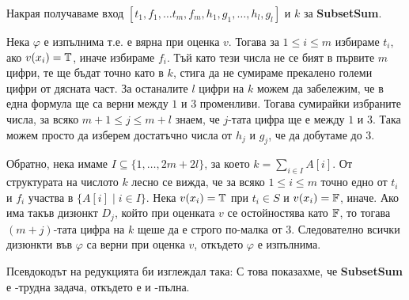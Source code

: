 Накрая получаваме вход $[t_1, f_1, \dots t_m, f_m, h_1, g_1, \dots, h_l, g_l]$ и $k$ за \textbf{SubsetSum}.

Нека $\varphi$ е изпълнима т.е. е вярна при оценка $v$.
Тогава за $1 \leq i \leq m$ избираме $t_i$, ако $v(x_i) = \mathbb{T}$, иначе избираме $f_i$.
Тъй като тези числа не се бият в първите $m$ цифри, те ще бъдат точно като в $k$, стига да не сумираме прекалено големи цифри от дясната част.
За останалите $l$ цифри на $k$ можем да забележим, че в една формула ще са верни между $1$ и $3$ променливи.
Тогава сумирайки избраните числа, за всяко $m + 1 \leq j \leq m + l$ знаем, че $j$-тата цифра ще е между $1$ и $3$.
Така можем просто да изберем достатъчно числа от $h_j$ и $g_j$, че да добутаме до $3$.

Обратно, нека имаме $I \subseteq \{ 1, \dots, 2m + 2l \}$, за което $k = \sum\limits_{i \in I} A[i]$.
От структурата на числото $k$ лесно се вижда, че за всяко $1 \leq i \leq m$ точно едно от $t_i$ и $f_i$ участва в $\{ A[i] \mid i \in I \}$.
Нека $v(x_i) = \mathbb{T}$ при $t_i \in S$ и $v(x_i) = \mathbb{F}$, иначе.
Ако има такъв дизюнкт $D_j$, който при оценката $v$ се остойностява като $\mathbb{F}$, то тогава $(m + j)$-тата цифра на $k$ щеше да е строго по-малка от $3$.
Следователно всички дизюнкти във $\varphi$ са верни при оценка $v$, откъдето $\varphi$ е изпълнима.

Псевдокодът на редукцията би изглеждал така:
С това показахме, че \textbf{SubsetSum} е \NP-трудна задача, откъдето е и \NP-пълна.